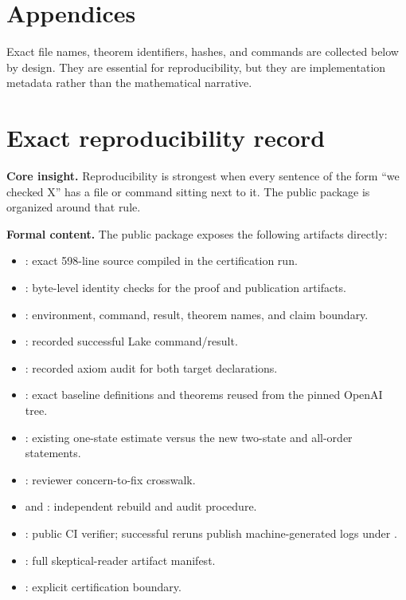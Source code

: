 \documentclass[11pt]{article}
\theoremstyle{highend}
\theoremstyle{definition}
\begin{document}
\appendix
\section*{Appendices}
\noindent Exact file names, theorem identifiers, hashes, and commands are collected below by design. They are essential for reproducibility, but they are implementation metadata rather than the mathematical narrative.

\section{Exact reproducibility record}
\begin{eurekabox}
\textbf{Core insight.} Reproducibility is strongest when every sentence of the form ``we checked X'' has a file or command sitting next to it. The public package is organized around that rule.
\end{eurekabox}
\noindent\textbf{Formal content.}
The public package exposes the following artifacts directly:
\begin{itemize}
  \item {}: exact 598-line source compiled in the certification run.
  \item {}: byte-level identity checks for the proof and publication artifacts.
  \item {}: environment, command, result, theorem names, and claim boundary.
  \item {}: recorded successful Lake command/result.
  \item {}: recorded axiom audit for both target declarations.
  \item {}: exact baseline definitions and theorems reused from the pinned OpenAI tree.
  \item {}: existing one-state estimate versus the new two-state and all-order statements.
  \item {}: reviewer concern-to-fix crosswalk.
  \item {} and : independent rebuild and audit procedure.
  \item {}: public CI verifier; successful reruns publish machine-generated logs under .
  \item {}: full skeptical-reader artifact manifest.
  \item {}: explicit certification boundary.
\end{itemize}
\end{document}

